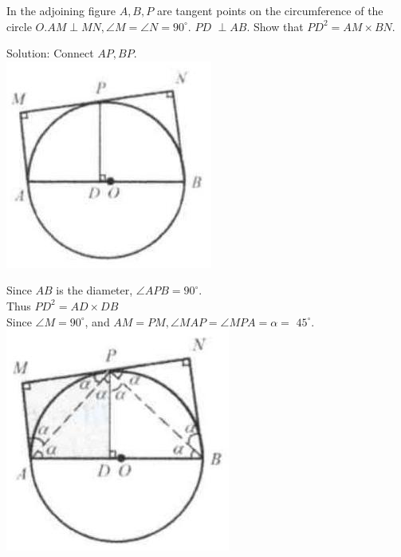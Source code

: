 \documentclass{article}
\begin{document}
In the adjoining figure \(A, B, P\) are tangent points on the circumference of the circle \(O . A M \perp M N, \angle M=\angle N=90^{\circ}\). \(P D\) \(\perp A B\). Show that \(P D^{2}=A M \times B N\).

Solution:
Connect \(A P, B P\).\\
\centering
\includegraphics[width=\textwidth]{images/148(5).jpg}

Since \(A B\) is the diameter, \(\angle A P B=90^{\circ}\).\\
Thus \(P D^{2}=A D \times D B\)\\
Since \(\angle M=90^{\circ}\), and \(A M=P M, \angle M A P=\angle M P A=\alpha=\) \(45^{\circ}\).\\
\centering
\includegraphics[width=\textwidth]{images/148.jpg}
\end{document}
